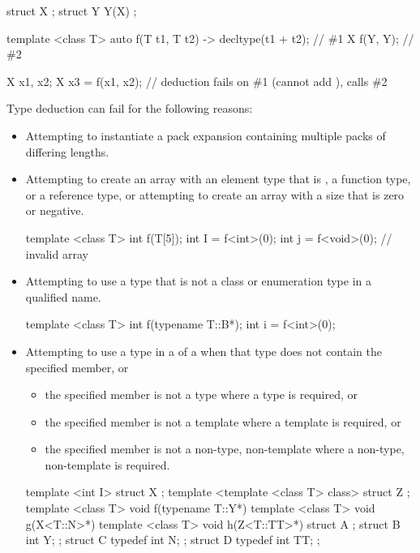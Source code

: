 \pnum
\begin{example}
\begin{codeblock}
struct X { };
struct Y {
  Y(X) {}
};

template <class T> auto f(T t1, T t2) -> decltype(t1 + t2);     // \#1
X f(Y, Y);                                                      // \#2

X x1, x2;
X x3 = f(x1, x2);   // deduction fails on \#1 (cannot add ), calls \#2
\end{codeblock}
\end{example}

\pnum
\begin{note}
Type deduction can fail for the following reasons:
\begin{itemize}
\item Attempting to instantiate a pack expansion containing multiple packs of differing lengths.
\item
Attempting to create an array with an element type that is , a
function type, or a reference type, or attempting
to create an array with a size that is zero or negative.
\begin{example}
\begin{codeblock}
template <class T> int f(T[5]);
int I = f<int>(0);
int j = f<void>(0);             // invalid array
\end{codeblock}
\end{example}
\item
Attempting to use a type that is not a class or enumeration type in a qualified name.
\begin{example}
\begin{codeblock}
template <class T> int f(typename T::B*);
int i = f<int>(0);
\end{codeblock}
\end{example}
\item
Attempting to use a type in a  of a
 when
that type does not contain the specified member, or
\begin{itemize}
\item
the specified member is not a type where a type is required, or
\item
the specified member is not a template where a template is required, or
\item
the specified member is not a non-type, non-template where a non-type,
non-template is required.
\end{itemize}
\begin{example}
\begin{codeblock}
template <int I> struct X { };
template <template <class T> class> struct Z { };
template <class T> void f(typename T::Y*) {}
template <class T> void g(X<T::N>*) {}
template <class T> void h(Z<T::TT>*) {}
struct A {};
struct B { int Y; };
struct C {
  typedef int N;
};
struct D {
  typedef int TT;
};


\end{codeblock}
\end{example}
\end{itemize}
\end{note}
